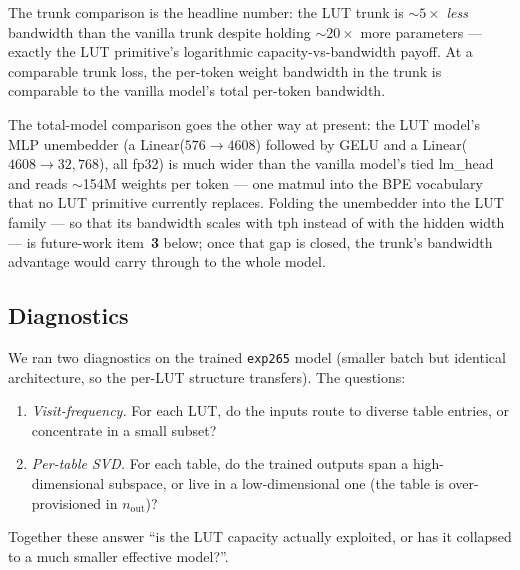 \documentclass[11pt]{article}
\begin{document}
The trunk comparison is the headline number: the LUT trunk is $\sim$$5\times$ \emph{less} bandwidth than the vanilla trunk despite holding $\sim$$20\times$ more parameters --- exactly the LUT primitive's logarithmic capacity-vs-bandwidth payoff.
At a comparable trunk loss, the per-token weight bandwidth in the trunk is comparable to the vanilla model's total per-token bandwidth.

The total-model comparison goes the other way at present: the LUT model's MLP unembedder (a Linear($576 \to 4608$) followed by GELU and a Linear($4608 \to 32{,}768$), all fp32) is much wider than the vanilla model's tied lm\_head and reads $\sim$154M weights per token --- one matmul into the BPE vocabulary that no LUT primitive currently replaces.
Folding the unembedder into the LUT family --- so that its bandwidth scales with $\text{tph}$ instead of with the hidden width --- is future-work item~\textbf{3} below; once that gap is closed, the trunk's bandwidth advantage would carry through to the whole model.

\subsection{Diagnostics}
\label{sec:current:diag}

We ran two diagnostics on the trained \texttt{exp265} model (smaller batch but identical architecture, so the per-LUT structure transfers).
The questions:
\begin{enumerate}
\setlength{\itemsep}{2pt}
    \item \emph{Visit-frequency.} For each LUT, do the inputs route to diverse table entries, or concentrate in a small subset?
    \item \emph{Per-table SVD.} For each table, do the trained outputs span a high-dimensional subspace, or live in a low-dimensional one (the table is over-provisioned in $n_{\text{out}}$)?
\end{enumerate}
Together these answer ``is the LUT capacity actually exploited, or has it collapsed to a much smaller effective model?''.
\end{document}
